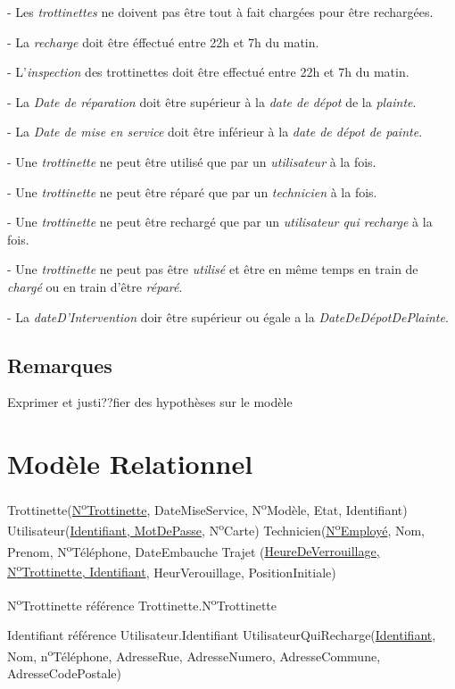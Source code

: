 \documentclass{article}
\newcommand\tab[1][1cm]{\hspace*{#1}}
\begin{document}
- Les \textit{trottinettes} ne doivent pas être tout à fait chargées pour être rechargées.

- La \textit{recharge} doit être éffectué entre 22h et 7h du matin.

- L'\textit{inspection} des trottinettes doit être effectué entre 22h et 7h du matin.

- La \textit{Date de réparation} doit être supérieur à la \textit{date de dépot} de la \textit{plainte}.

- La \textit{Date de mise en service} doit être inférieur à la \textit{date de dépot de painte}.

- Une \textit{trottinette} ne peut être utilisé que par un \textit{utilisateur} à la fois.

- Une \textit{trottinette} ne peut être réparé que par un \textit{technicien} à la fois.

- Une \textit{trottinette} ne peut être rechargé que par un \textit{utilisateur qui recharge} à la fois.

- Une \textit{trottinette} ne peut pas être \textit{utilisé} et être en même temps en train de \textit{chargé} ou en train d'être \textit{réparé}.

- La \textit{dateD'Intervention} doir être supérieur ou égale a la \textit{DateDeDépotDePlainte}.



\subsection*{Remarques}
Exprimer et justi??fier des hypothèses sur le modèle

\section{Modèle Relationnel}
Trottinette(\underline{N\textsuperscript{o}Trottinette}, DateMiseService, N\textsuperscript{o}Modèle, Etat, Identifiant)
\bigbreak
Utilisateur(\underline{Identifiant, MotDePasse}, N\textsuperscript{o}Carte)
\bigbreak
Technicien(\underline{N\textsuperscript{o}Employé}, Nom, Prenom, N\textsuperscript{o}Téléphone, DateEmbauche
\bigbreak
Trajet (\underline{HeureDeVerrouillage, N\textsuperscript{o}Trottinette, Identifiant}, HeurVerouillage, PositionInitiale)

\tab N\textsuperscript{o}Trottinette référence Trottinette.N\textsuperscript{o}Trottinette

\tab Identifiant référence Utilisateur.Identifiant
\bigbreak
UtilisateurQuiRecharge(\underline{Identifiant}, Nom, n\textsuperscript{o}Téléphone, AdresseRue, AdresseNumero, AdresseCommune, AdresseCodePostale)
\end{document}

